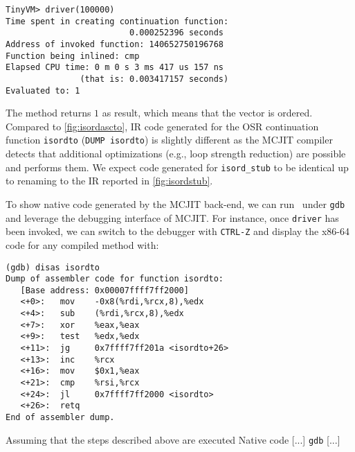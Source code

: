 \begin{small}
\begin{verbatim}
TinyVM> driver(100000)
Time spent in creating continuation function:
                         0.000252396 seconds
Address of invoked function: 140652750196768
Function being inlined: cmp
Elapsed CPU time: 0 m 0 s 3 ms 417 us 157 ns
               (that is: 0.003417157 seconds)
Evaluated to: 1
\end{verbatim}
\end{small}

\noindent The method returns $1$ as result, which means that the vector is ordered. Compared to \myfigure\ref{fig:isordascto}, IR code generated for the OSR continuation function {\tt isordto} ({\tt DUMP isordto}) is slightly different as the MCJIT compiler detects that additional optimizations (e.g., loop strength reduction) are possible and performs them. We expect code generated for {\tt isord\_stub} to be identical up to renaming to the IR reported in \myfigure\ref{fig:isordstub}.

To show native code generated by the MCJIT back-end, we can run \tinyvm\ under {\tt gdb} and leverage the debugging interface of MCJIT. For instance, once {\tt driver} has been invoked, we can switch to the debugger with {\tt CTRL-Z} and display the x86-64 code for any compiled method with:
\begin{small}
\begin{verbatim}
(gdb) disas isordto
Dump of assembler code for function isordto:
   [Base address: 0x00007ffff7ff2000]
   <+0>:   mov    -0x8(%rdi,%rcx,8),%edx
   <+4>:   sub    (%rdi,%rcx,8),%edx
   <+7>:   xor    %eax,%eax
   <+9>:   test   %edx,%edx
   <+11>:  jg     0x7ffff7ff201a <isordto+26>
   <+13>:  inc    %rcx
   <+16>:  mov    $0x1,%eax
   <+21>:  cmp    %rsi,%rcx
   <+24>:  jl     0x7ffff7ff2000 <isordto>
   <+26>:  retq
End of assembler dump.
\end{verbatim}
\end{small}


Assuming that the steps described above are executed  
Native code [...] {\tt gdb} [...]



